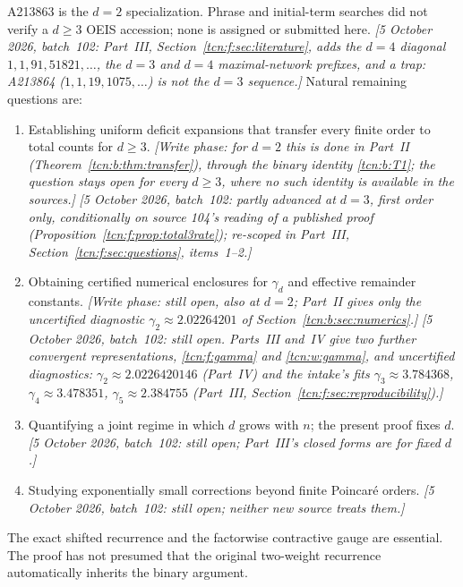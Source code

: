 \documentclass[11pt,letterpaper]{article}
\theoremstyle{remark}
\begin{document}
A213863 is the $d=2$ specialization. Phrase and initial-term searches did not verify a $d\ge3$ OEIS accession; none is assigned or submitted here. \emph{[5 October 2026, batch~102: Part~III, Section~\ref{tcn:f:sec:literature}, adds the $d=4$ diagonal $1,1,91,51821,\ldots$, the $d=3$ and $d=4$ maximal-network prefixes, and a trap: A213864 ($1,1,19,1075,\ldots$) is not the $d=3$ sequence.]} Natural remaining questions are:
\begin{enumerate}[itemsep=2pt]
\item Establishing uniform deficit expansions that transfer every finite order to total counts for $d\ge3$. \emph{[Write phase: for $d=2$ this is done in Part~II (Theorem~\ref{tcn:b:thm:transfer}), through the binary identity \eqref{tcn:b:T1}; the question stays open for every $d\ge3$, where no such identity is available in the sources.]} \emph{[5 October 2026, batch~102: partly advanced at $d=3$, first order only, conditionally on source 104's reading of a published proof (Proposition~\ref{tcn:f:prop:total3rate}); re-scoped in Part~III, Section~\ref{tcn:f:sec:questions}, items~1--2.]}
\item Obtaining certified numerical enclosures for $\gamma_d$ and effective remainder constants. \emph{[Write phase: still open, also at $d=2$; Part~II gives only the uncertified diagnostic $\gamma_2\approx2.02264201$ of Section~\ref{tcn:b:sec:numerics}.]} \emph{[5 October 2026, batch~102: still open. Parts~III and~IV give two further convergent representations, \eqref{tcn:f:gamma} and \eqref{tcn:w:gamma}, and uncertified diagnostics: $\gamma_2\approx2.0226420146$ (Part~IV) and the intake's fits $\gamma_3\approx3.784368$, $\gamma_4\approx3.478351$, $\gamma_5\approx2.384755$ (Part~III, Section~\ref{tcn:f:sec:reproducibility}).]}
\item Quantifying a joint regime in which $d$ grows with $n$; the present proof fixes $d$. \emph{[5 October 2026, batch~102: still open; Part~III's closed forms are for fixed $d$.]}
\item Studying exponentially small corrections beyond finite Poincar\'e orders. \emph{[5 October 2026, batch~102: still open; neither new source treats them.]}
\end{enumerate}
The exact shifted recurrence and the factorwise contractive gauge are essential. The proof has not presumed that the original two-weight recurrence automatically inherits the binary argument.
\end{document}
